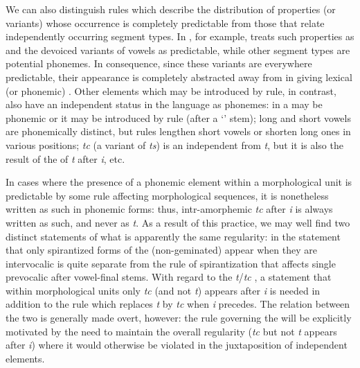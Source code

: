We can also distinguish rules which describe the distribution of
properties (or variants) whose occurrence is completely predictable
from those that relate independently occurring segment types. In
, for example, {\Sapir} treats such properties as 
and the devoiced variants of vowels as predictable, while other
segment types are potential phonemes. In consequence, since these
variants are everywhere predictable, their appearance is completely
abstracted away from in giving lexical (or phonemic)
. Other elements which may be introduced by rule, in
{contrast}, also have an independent status in the language as phonemes:
in  a  may be phonemic or it may be
introduced by rule (after a `' stem); long and short vowels
are phonemically distinct, but rules lengthen short vowels or shorten
long ones in various positions; \emph{tc} (a variant of \emph{ts}) is
an independent  from \emph{t}, but it is also the result of the
 of \emph{t} after \emph{i}, etc.

In cases where the presence of a phonemic element within a
morphological unit is predictable by some rule affecting morphological
sequences, it is nonetheless written as such in phonemic forms: thus,
intr-amorphemic \emph{tc} after \emph{i} is always written as such, and
never as \emph{t}. As a result of this practice, we may well find two
distinct statements of what is apparently the same regularity: in
 the statement that only spirantized forms of the
(non-geminated)  appear when they are intervocalic is quite
separate from the rule of spirantization that affects single
prevocalic  after vowel-final stems. With regard to the
\emph{t}/\emph{tc} , a statement that within morphological
units only \emph{tc} (and not \emph{t}) appears after \emph{i} is
needed in addition to the  rule which replaces \emph{t}
by \emph{tc} when \emph{i} precedes. The relation between the two is
generally made overt, however: the rule governing the  will
be explicitly motivated by the need to maintain the overall regularity
(\emph{tc} but not \emph{t} appears after \emph{i}) where it would
otherwise be violated in the juxtaposition of independent elements.

